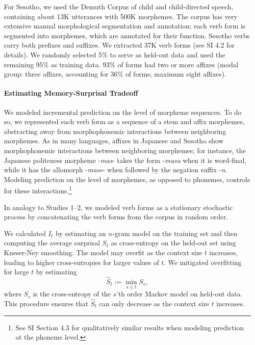 For Sesotho, we used the Demuth Corpus \citep{demuth1992acquisition} of child and child-directed speech, containing about 13K utterances with 500K morphemes.
The corpus has very extensive manual morphological segmentation and annotation; each verb form is segmented into morphemes, which are annotated for their function.
Sesotho verbs carry both prefixes and suffixes.
We extracted 37K verb forms (see SI 4.2 for details).
We randomly selected 5\% to serve as held-out data and used the remaining 95\% as training data.
93\% of forms had two or more affixes (modal group: three affixes, accounting for 36\% of forms; maximum eight affixes).


\paragraph{Estimating Memory-Surprisal Tradeoff}
We modeled incremental prediction on the level of morpheme sequences.
To do so, we represented each verb form as a sequence of a stem and affix morphemes, abstracting away from morphophonemic interactions between neighboring morphemes.
As in many languages, affixes in Japanese and Sesotho show morphophonemic interactions between neighboring morphemes; for instance, the Japanese politeness morpheme -\textit{mas}- takes the form -\textit{masu} when it is word-final, while it has the allomorph -\textit{mase}- when followed by the negation suffix -\textit{n}.
Modeling prediction on the level of morphemes, as opposed to phonemes, controls for these interactions.\footnote{See SI Section 4.3 for qualitatively similar results when modeling prediction at the phoneme level.}

In analogy to Studies 1--2, we modeled verb forms as a stationary stochastic process by concatenating the verb forms from the corpus in random order.

We calculated $I_t$ by estimating an $n$-gram model on the training set and then computing the average surprisal $S_t$ as cross-entropy on the held-out set using Kneser-Ney smoothing.
The model may overfit as the context size $t$ increases, leading to higher cross-entropies for larger values of $t$.
We mitigated overfitting for large $t$ by estimating
\begin{equation}
\hat{S}_t := \min_{s \leq t} S_s,
\end{equation}
where $S_s$ is the cross-entropy of the $s$'th order Markov model on held-out data.
This procedure ensures that $\hat{S}_t$ can only decrease as the context size $t$ increases.

